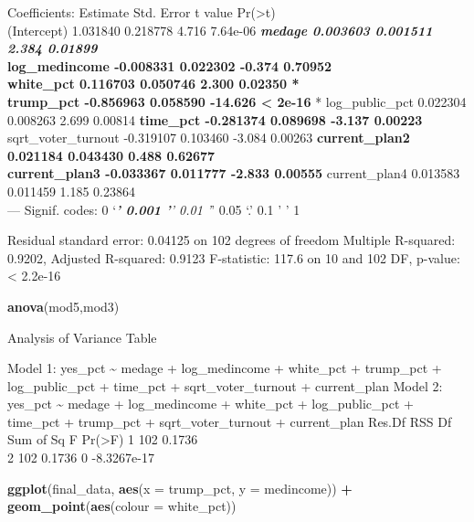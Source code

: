 \documentclass[
]{article}
\newenvironment{Shaded}{\begin{snugshade}}{\end{snugshade}}
\newcommand{\DataTypeTok}[1]{\textcolor[rgb]{0.13,0.29,0.53}{#1}}
\newcommand{\KeywordTok}[1]{\textcolor[rgb]{0.13,0.29,0.53}{\textbf{#1}}}
\newcommand{\NormalTok}[1]{#1}
\newcommand{\OperatorTok}[1]{\textcolor[rgb]{0.81,0.36,0.00}{\textbf{#1}}}
\newcommand{\StringTok}[1]{\textcolor[rgb]{0.31,0.60,0.02}{#1}}
\begin{document}
Coefficients: Estimate Std. Error t value
Pr(\textgreater\textbar t\textbar)\\
(Intercept) 1.031840 0.218778 4.716 7.64e-06 \textbf{\emph{ medage
0.003603 0.001511 2.384 0.01899 }\\
log\_medincome -0.008331 0.022302 -0.374 0.70952\\
white\_pct 0.116703 0.050746 2.300 0.02350 *\\
trump\_pct -0.856963 0.058590 -14.626 \textless{} 2e-16 }*
log\_public\_pct 0.022304 0.008263 2.699 0.00814 \textbf{ time\_pct
-0.281374 0.089698 -3.137 0.00223 } sqrt\_voter\_turnout -0.319107
0.103460 -3.084 0.00263 \textbf{ current\_plan2 0.021184 0.043430 0.488
0.62677\\
current\_plan3 -0.033367 0.011777 -2.833 0.00555 } current\_plan4
0.013583 0.011459 1.185 0.23864\\
--- Signif. codes: 0 `\emph{\textbf{' 0.001 '}' 0.01 '}' 0.05 `.' 0.1 '
' 1

Residual standard error: 0.04125 on 102 degrees of freedom Multiple
R-squared: 0.9202, Adjusted R-squared: 0.9123 F-statistic: 117.6 on 10
and 102 DF, p-value: \textless{} 2.2e-16

\begin{Shaded}
\begin{Highlighting}[]
\KeywordTok{anova}\NormalTok{(mod5,mod3)}
\end{Highlighting}
\end{Shaded}

Analysis of Variance Table

Model 1: yes\_pct \textasciitilde{} medage + log\_medincome + white\_pct
+ trump\_pct + log\_public\_pct + time\_pct + sqrt\_voter\_turnout +
current\_plan Model 2: yes\_pct \textasciitilde{} medage +
log\_medincome + white\_pct + log\_public\_pct + time\_pct + trump\_pct
+ sqrt\_voter\_turnout + current\_plan Res.Df RSS Df Sum of Sq F
Pr(\textgreater F) 1 102 0.1736\\
2 102 0.1736 0 -8.3267e-17

\begin{Shaded}
\begin{Highlighting}[]
\KeywordTok{ggplot}\NormalTok{(final_data, }\KeywordTok{aes}\NormalTok{(}\DataTypeTok{x =}\NormalTok{ trump_pct, }\DataTypeTok{y =}\NormalTok{ medincome)) }\OperatorTok{+}
\StringTok{   }\KeywordTok{geom_point}\NormalTok{(}\KeywordTok{aes}\NormalTok{(}\DataTypeTok{colour =}\NormalTok{ white_pct))}
\end{Highlighting}
\end{Shaded}
\end{document}
